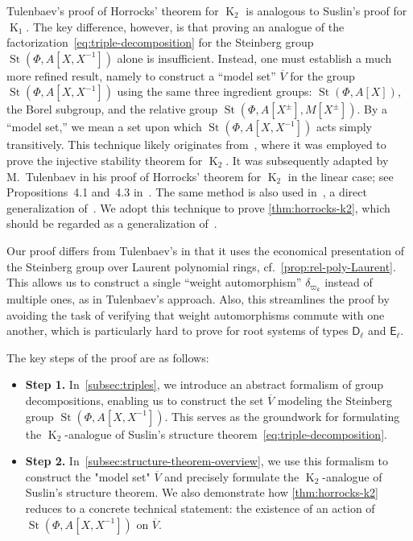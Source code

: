 \documentclass[oneside, 10pt]{amsart}
\DeclareMathOperator{\St}{St}
\DeclareMathOperator{\K}{K}
\newcommand{\rD}{\mathsf{D}}
\newcommand{\rE}{\mathsf{E}}
\newcommand{\inv}{^{-1}}
\numberwithin{equation}{section}
\numberwithin{thm}{section}
\numberwithin{lemma}{section}
\theoremstyle{definition}
\theoremstyle{remark}
\begin{document}
Tulenbaev's proof of Horrocks' theorem for \( \K_2 \) is analogous to Suslin's proof for \( \K_1 \).
The key difference, however, is that proving an analogue of the factorization~\eqref{eq:triple-decomposition} for the Steinberg group
\( \St(\Phi, A[X, X\inv]) \) alone is insufficient.
Instead, one must establish a much more refined result, namely to construct a ``model set'' \( \overline{V} \) for the group
\( \St(\Phi, A[X, X\inv]) \) using the same three ingredient groups: \( \St(\Phi, A[X]) \), the Borel subgroup, and the relative group
\( \St(\Phi, A[X^\pm], M[X^\pm]) \).
By a ``model set,'' we mean a set upon which \( \St(\Phi, A[X, X\inv]) \) acts simply transitively.
This technique likely originates from~\cite{ST76}, where it was employed to prove the injective stability theorem for \( \K_2 \).
It was subsequently adapted by M.~Tulenbaev in his proof of Horrocks' theorem for \( \K_2 \) in the linear case; see Propositions~4.1 and~4.3 in~\cite{Tu83}.
The same method is also used in~\cite[Theorem~3]{LS20}, a direct generalization of~\cite[Proposition~4.3]{Tu83}.
We adopt this technique to prove \cref{thm:horrocks-k2}, which should be regarded as a generalization of~\cite[Proposition~4.1]{Tu83}.

Our proof differs from Tulenbaev's in that it uses the economical presentation of the Steinberg group over Laurent polynomial rings, cf.~\cref{prop:rel-poly-Laurent}.
This allows us to construct a single ``weight automorphism'' $\delta_{\varpi_k}$ instead of multiple ones, as in Tulenbaev's approach.
Also, this streamlines the proof by avoiding the task of verifying that weight automorphisms commute with one another,
which is particularly hard to prove for root systems of types $\rD_\ell$ and $\rE_\ell$.

The key steps of the proof are as follows:
\begin{itemize}
\item \textbf{Step 1.} In~\cref{subsec:triples}, we introduce an abstract formalism of group decompositions, enabling us to construct the set \( \overline{V} \) modeling
the Steinberg group \( \St(\Phi, A[X, X\inv]) \). This serves as the groundwork for formulating the \( \K_2 \)-analogue of Suslin's structure theorem~\eqref{eq:triple-decomposition}.
\item \textbf{Step 2.} In~\cref{subsec:structure-theorem-overview}, we use this formalism to construct the "model set" \( \overline{V} \) and precisely formulate the \( \K_2 \)-analogue
of Suslin's structure theorem. We also demonstrate how \cref{thm:horrocks-k2} reduces to a concrete technical statement: the existence of an action of \( \St(\Phi, A[X, X\inv]) \) on \( \overline{V} \).
\end{itemize}
\end{document}
